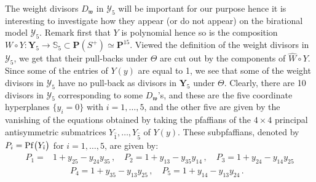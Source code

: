 \documentclass[11pt]{amsart}
\begin{document}
The weight divisors $D_{\mathfrak w}$ in $\boldsymbol{\mathcal Y}_5$ will be important for our purpose hence it is interesting to investigate how they appear (or do not appear) on the birational model  $\boldsymbol{\mathcal Y}_5$. Remark first that $Y$ is polynomial hence so is the composition $W\circ Y: \boldsymbol{Y}_5\rightarrow \mathbb S_5\subset \mathbf P(S^+)\simeq \mathbf P^{15}$. Viewed the definition of the weight divisors in 
$\boldsymbol{\mathcal Y}_5$, we get that their pull-backs under $\Theta$ are cut out by the components of $\widehat W\circ Y$. Since some of the entries of $Y(y)$ are equal to 1, we see that some of the weight divisors in $\boldsymbol{\mathcal Y}_5$ have  no pull-back as divisors in $\boldsymbol{Y}_5$ under $\Theta$.  Clearly, there are 10 divisors in $\boldsymbol{\mathcal Y}_5$ corresponding to some $D_{\mathfrak w}$'s, and these are 
the five coordinate hyperplanes $\{y_i=0\}$ with $i=1,\ldots,5$, and the other five  are given by the vanishing of the equations obtained by taking the pfaffians of the $4\times 4$ principal antisymmetric submatrices $Y_{\hat 1},\ldots,Y_{\hat 5} $ of $Y(y)$. These subpfaffians, denoted by  $P_i={\rm Pf}\big(Y_{\hat{\imath}}\big)$ for $i=1,\ldots,5$, are given by:  
\begin{align}
\label{Eq:Pi}
P_1
= &
 1+\mathit{y_{25}}-\mathit{y_{24}} \mathit{y_{35}} 
\,, \quad 
P_2
=  
 1+\mathit{y_{13}} -\mathit{y_{35}} \mathit{y_{14}}
\,, \quad 
P_3
 =  
 1+\mathit{y_{24}} -\mathit{y_{14}} \mathit{y_{25}} 
\\ 
&\qquad P_4
 =  
 1+\mathit{y_{35}}-\mathit{y_{13}} \mathit{y_{25}}
\,, \quad  
P_5
 =  
 1+\mathit{y_{14}} -\mathit{y_{13}} \mathit{y_{24}} \, . 
 \nonumber
\end{align}
\end{document}
